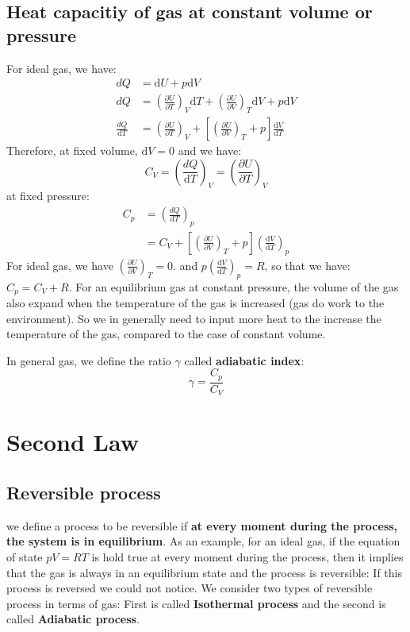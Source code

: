 \documentclass{article}
\newcommand{\pfrac}[2]{\frac{\partial #1}{\partial #2}}
\newcommand{\dbar}{d}
\newcommand{\dnor}{\text{d}}
\begin{document}
\subsection*{Heat capacitiy of gas at constant volume or pressure}
For ideal gas, we have:
\begin{align}
    \dbar Q &= \dnor U + p \dnor V \\
    \dbar Q & = \left(\pfrac{U}{T}\right)_V \dnor T + \left(\pfrac{U}{V}\right)_T \dnor V + p \dnor V \\
    \frac{\dbar Q}{\dnor T} &= \left(\pfrac{U}{T}\right)_V + \left[ \left(\pfrac{U}{V}\right)_T  + p \right] \frac{\dnor V}{\dnor T}
\end{align}
Therefore, at fixed volume, $\dnor V = 0$ and we have:
\begin{equation}
    C_V = \left(\frac{\dbar Q}{\dnor T}\right)_V = \left(\pfrac{U}{T}\right)_V
\end{equation}
at fixed pressure:
\begin{align}
    C_p & = \left(\frac{\dbar Q}{\dnor T}\right)_p \\
        & = C_V + \left[ \left(\pfrac{U}{V}\right)_T  + p \right] \left(\frac{\dnor V}{\dnor T}\right)_p
\end{align}
For ideal gas, we have $\left(\pfrac{U}{V}\right)_T = 0$. and $p \left(\frac{\dnor V}{\dnor T}\right)_p = R$,
so that we have: $C_p = C_V + R$. For an equilibrium gas at constant pressure, the volume of the gas also expand when
the temperature of the gas is increased (gas do work to the environment). 
So we in generally need to input more heat to the increase the temperature of the gas, compared to the case of constant 
volume. 

In general gas, we define the ratio $\gamma$ called \textbf{adiabatic index}:
\begin{equation}
    \gamma = \frac{C_p}{C_V}
\end{equation}


\section{Second Law}

\subsection*{Reversible process}
we define a process to be reversible if \textbf{at every moment during the process, the system
is in equilibrium}. As an example, for an ideal gas, if the equation of state $pV = RT$ is hold true
at every moment during the process, then it implies that the gas is always in an equilibrium state
and the process is reversible: If this process is reversed we could not notice. 
We consider two types of reversible process in terms of gas: First is called \textbf{Isothermal process}
and the second is called \textbf{Adiabatic process}.
\end{document}
